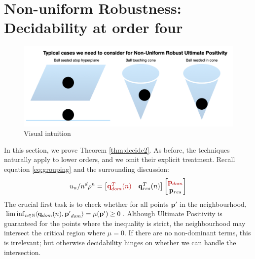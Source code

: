 \section{Non-uniform Robustness: Decidability at order four}
\label{section:decidability2}
\begin{figure}[h]

\includegraphics[width=\textwidth]{picture1.png}
\caption{Visual intuition}
\label{fig:geometricpicture}
\end{figure}

In this section, we prove Theorem \ref{thm:decide2}. As before, the techniques naturally apply to lower orders, and we omit their explicit treatment. Recall equation \ref{eq:grouping} and the surrounding discussion:
\begin{equation}
u_n/n^d\rho^n = \begin{bmatrix}
{\color{red!70!black} \mathbf{q}_{dom}^T(n) } & \mathbf{q}_{res}^T(n)
\end{bmatrix}
\begin{bmatrix}
{\color{red!70!black} \mathbf{p}_{dom}} \\
\mathbf{p}_{res}
\end{bmatrix}
\end{equation}
The crucial first task is to check whether for all points $\mathbf{p'}$ in the neighbourhood, \\$\liminf_{n\in\mathbb{N}}\langle\mathbf{q}_{dom}(n), \mathbf{p'}_{dom}\rangle = \mu(\mathbf{p'}) \ge 0$. Although Ultimate Positivity is guaranteed for the points where the inequality is strict, the neighbourhood may intersect the critical region where $\mu = 0$. If there are no non-dominant terms, this is irrelevant; but otherwise decidability hinges on whether we can handle the intersection.

